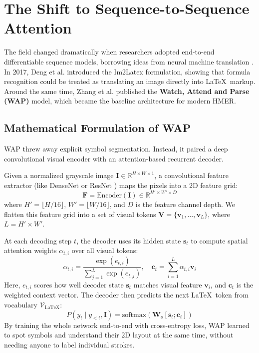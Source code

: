 \section{The Shift to Sequence-to-Sequence Attention}
\label{sec:seq2seq_revolution}

The field changed dramatically when researchers adopted end-to-end differentiable sequence models, borrowing ideas from neural machine translation \cite{vaswani2017attention}. In 2017, Deng et al. \cite{deng2017image} introduced the Im2Latex formulation, showing that formula recognition could be treated as translating an image directly into \LaTeX\ markup. Around the same time, Zhang et al. \cite{zhang2017watch} published the \textbf{Watch, Attend and Parse (WAP)} model, which became the baseline architecture for modern HMER.

\subsection{Mathematical Formulation of WAP}
WAP threw away explicit symbol segmentation. Instead, it paired a deep convolutional visual encoder with an attention-based recurrent decoder.

Given a normalized grayscale image $\mathbf{I} \in \mathbb{R}^{H \times W \times 1}$, a convolutional feature extractor (like DenseNet \cite{huang2017densely} or ResNet \cite{he2016deep}) maps the pixels into a 2D feature grid:
\begin{equation}
\mathbf{F} = \text{Encoder}(\mathbf{I}) \in \mathbb{R}^{H' \times W' \times D}
\end{equation}
where $H' = \lfloor H / 16 \rfloor$, $W' = \lfloor W / 16 \rfloor$, and $D$ is the feature channel depth. We flatten this feature grid into a set of visual tokens $\mathbf{V} = \{\mathbf{v}_1, \dots, \mathbf{v}_L\}$, where $L = H' \times W'$.

At each decoding step $t$, the decoder uses its hidden state $\mathbf{s}_t$ to compute spatial attention weights $\alpha_{t, i}$ over all visual tokens:
\begin{equation}
\alpha_{t, i} = \frac{\exp(e_{t, i})}{\sum_{j=1}^L \exp(e_{t, j})}, \quad \mathbf{c}_t = \sum_{i=1}^L \alpha_{t, i} \mathbf{v}_i
\end{equation}
Here, $e_{t, i}$ scores how well decoder state $\mathbf{s}_t$ matches visual feature $\mathbf{v}_i$, and $\mathbf{c}_t$ is the weighted context vector. The decoder then predicts the next \LaTeX\ token from vocabulary $\mathcal{V}_{\text{LaTeX}}$:
\begin{equation}
P(y_t \mid y_{<t}, \mathbf{I}) = \text{softmax}\left( \mathbf{W}_o [\mathbf{s}_t; \mathbf{c}_t] \right)
\end{equation}
By training the whole network end-to-end with cross-entropy loss, WAP learned to spot symbols and understand their 2D layout at the same time, without needing anyone to label individual strokes.

